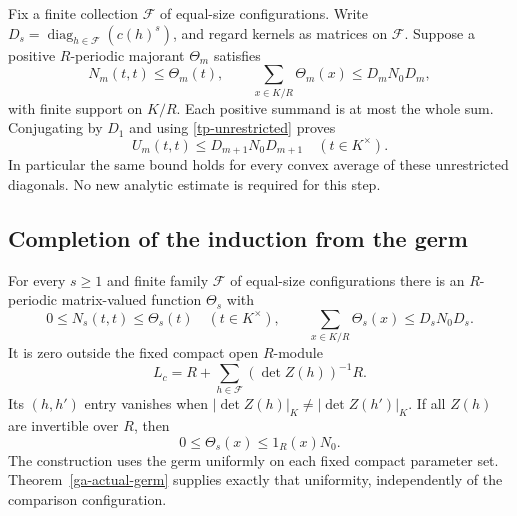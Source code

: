 Fix a finite collection $\mathcal F$ of equal-size configurations.
Write $D_s=\operatorname{diag}_{h\in\mathcal F}(c(h)^s)$,
and regard kernels as matrices on $\mathcal F$.
Suppose a positive $R$-periodic majorant $\Theta_m$ satisfies
\[
 N_m(t,t)\le\Theta_m(t),\qquad
 \sum_{x\in K/R}\Theta_m(x)\le D_mN_0D_m,
\]
with finite support on $K/R$. Each positive summand is at most
the whole sum. Conjugating by $D_1$ and using
\eqref{tp-unrestricted} proves
\begin{equation}\label{tp-diagonal}
                     U_m(t,t)\le D_{m+1}N_0D_{m+1}
                         \quad(t\in K^\times).
\end{equation}
In particular the same bound holds for every convex average
of these unrestricted diagonals. No new analytic estimate is
required for this step.

\subsection{Completion of the induction from the germ}

\begin{theorem}\label{tp-majorant}
For every $s\ge1$ and finite family $\mathcal F$ of equal-size
configurations there is an $R$-periodic matrix-valued function
$\Theta_s$ with
\begin{equation}\label{tp-majorant-properties}
 0\le N_s(t,t)\le\Theta_s(t)\quad(t\in K^\times),\qquad
 \sum_{x\in K/R}\Theta_s(x)\le D_sN_0D_s.
\end{equation}
It is zero outside the fixed compact open $R$-module
\[
                 L_c=R+\sum_{h\in\mathcal F}(\det Z(h))^{-1}R.
\]
Its $(h,h')$ entry vanishes when
$|\det Z(h)|_K\ne|\det Z(h')|_K$.
If all $Z(h)$ are invertible over $R$, then
\[
                      0\le\Theta_s(x)\le1_R(x)N_0.
\]
The construction uses the germ uniformly on each fixed compact
parameter set. Theorem~\ref{ga-actual-germ} supplies exactly
that uniformity, independently of the comparison configuration.
\end{theorem}

